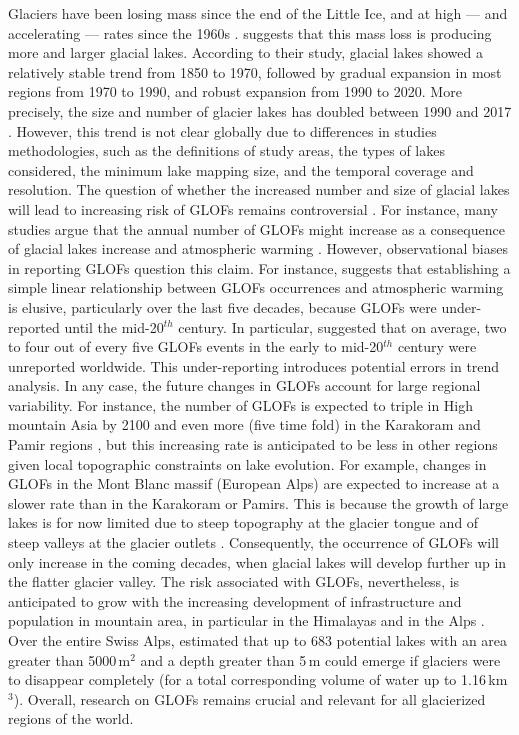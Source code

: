 Glaciers have been losing mass since the end of the Little Ice, and at high — and accelerating — rates since the 1960s \citep{Zemp&al2019,Hugonnet&al2021}. \cite{Zhang&al2024} suggests that this mass loss is producing more and larger glacial lakes. According to their study, glacial lakes showed a relatively stable trend from 1850 to 1970, followed by gradual expansion in most regions from 1970 to 1990, and robust expansion from 1990 to 2020. More precisely, the size and number of glacier lakes has doubled between 1990 and 2017 \citep{Shugar&al2020}. However, this trend is not clear globally due to differences in studies methodologies, such as the definitions of study areas, the types of lakes considered, the minimum lake mapping size, and the temporal coverage and resolution. The question of whether the increased number and size of glacial lakes will lead to increasing risk of GLOFs remains controversial \citep{Zhang&al2024}. For instance, many studies argue that the annual number of GLOFs might increase as a consequence of glacial lakes increase and atmospheric warming \citep{Tweed&Russel1999,Clague&Evans2000,Harrison&al2018,Richardson&Reynolds2000,Shugar&al2020,Zheng&al2021,Stuart&al2021,Compagno&al2022}. However, observational biases in reporting GLOFs question this claim. For instance, \cite{Veh&al2022} suggests that establishing a simple linear relationship between GLOFs occurrences and atmospheric warming is elusive, particularly over the last five decades, because GLOFs were under-reported until the mid-20$^{th}$ century. In particular, \cite{Veh&al2022} suggested that on average, two to four out of every five GLOFs events in the early to mid-20$^{th}$ century were unreported worldwide. This under-reporting introduces potential errors in trend analysis. In any case, the future changes in GLOFs account for large regional variability. For instance, the number of GLOFs is expected to triple in High mountain Asia by 2100 \cite{Zhang&al2024} and even more (five time fold) in the Karakoram and Pamir regions \citep{Zheng&al2021}, but this increasing rate is anticipated to be less in other regions given local topographic constraints on lake evolution. For example, changes in GLOFs in the Mont Blanc massif (European Alps) are expected to increase at a slower rate than in the Karakoram or Pamirs. This is because the growth of large lakes is for now limited due to steep topography at the glacier tongue and of steep valleys at the glacier outlets \citep{Magnin&al2020}. Consequently, the occurrence of GLOFs will only increase in the coming decades, when glacial lakes will develop further up in the flatter glacier valley. The risk associated with GLOFs, nevertheless, is anticipated to grow with the increasing development of infrastructure and population in mountain area, in particular in the Himalayas \citep[e.g.][]{Allen&al2022} and in the Alps \citep[e.g.][]{Haeberli&al2016}. Over the entire Swiss Alps, \cite{Steffen&al2022} estimated that up to 683 potential lakes with an area greater than 5000\,m$^2$ and a depth greater than 5\,m could emerge if glaciers were to disappear completely (for a total corresponding volume of water up to 1.16\,km$^3$). Overall, research on GLOFs remains crucial and relevant for all glacierized regions of the world.  


